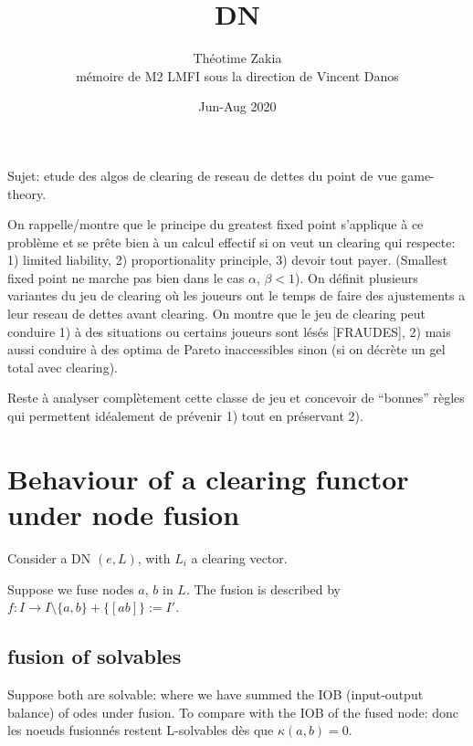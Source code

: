 \documentclass[11pt,oneside,twocolumn]{article}
\title{DN}
\author
{
Théotime Zakia
\\
mémoire de M2 LMFI sous la direction de Vincent Danos
}
\date{Jun-Aug 2020}
\begin{document}
\maketitle

Sujet: etude des algos de clearing de reseau de dettes du point de vue game-theory.

On rappelle/montre que le principe du greatest fixed point s'applique à ce problème
et se prête bien à un calcul effectif si on veut un clearing qui respecte:
1) limited liability,
2) proportionality principle,
3) devoir tout payer.
(Smallest fixed point ne marche pas bien dans le cas
$\alpha$,
$\beta <1$).
On définit plusieurs variantes du jeu de clearing où les joueurs ont le temps de faire des ajustements a leur reseau de dettes avant clearing. On montre que le jeu de
clearing peut conduire 1) à des situations ou certains joueurs sont lésés [FRAUDES], 2) mais aussi conduire à des optima de Pareto inaccessibles sinon (si on décrète un gel total avec clearing).

Reste à analyser complètement cette classe de jeu et concevoir de ``bonnes'' règles qui permettent idéalement de prévenir 1) tout en préservant 2).

\section{
Behaviour of a clearing functor
under node fusion}

Consider a DN $(e,L)$, with $L_i$
a clearing vector.


Suppose we fuse nodes $a$, $b$ in $L$.
The fusion is described by
$f: I \to I\setminus\{a,b\}+\{[ab]\}:=I'$.


\subsection{fusion of solvables}
Suppose both are solvable:
where we have summed the IOB (input-output balance) of odes under fusion.
To compare with the IOB of the fused node:
donc les noeuds fusionnés restent L-solvables
dès que
$\kappa(a,b)=0$.
\end{document}
